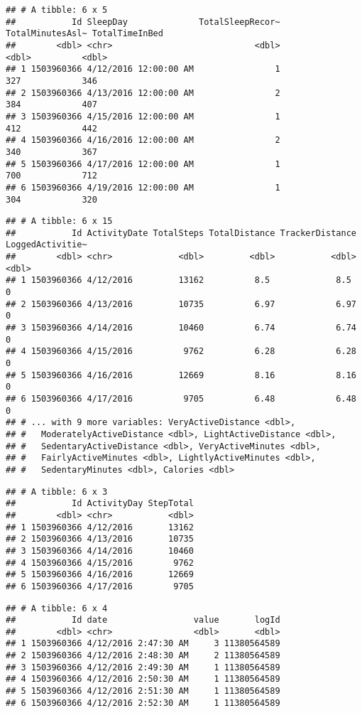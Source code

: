 \documentclass[
]{article}
\begin{document}
\begin{verbatim}
## # A tibble: 6 x 5
##           Id SleepDay              TotalSleepRecor~ TotalMinutesAsl~ TotalTimeInBed
##        <dbl> <chr>                            <dbl>            <dbl>          <dbl>
## 1 1503960366 4/12/2016 12:00:00 AM                1              327            346
## 2 1503960366 4/13/2016 12:00:00 AM                2              384            407
## 3 1503960366 4/15/2016 12:00:00 AM                1              412            442
## 4 1503960366 4/16/2016 12:00:00 AM                2              340            367
## 5 1503960366 4/17/2016 12:00:00 AM                1              700            712
## 6 1503960366 4/19/2016 12:00:00 AM                1              304            320
\end{verbatim}

\begin{verbatim}
## # A tibble: 6 x 15
##           Id ActivityDate TotalSteps TotalDistance TrackerDistance LoggedActivitie~
##        <dbl> <chr>             <dbl>         <dbl>           <dbl>            <dbl>
## 1 1503960366 4/12/2016         13162          8.5             8.5                 0
## 2 1503960366 4/13/2016         10735          6.97            6.97                0
## 3 1503960366 4/14/2016         10460          6.74            6.74                0
## 4 1503960366 4/15/2016          9762          6.28            6.28                0
## 5 1503960366 4/16/2016         12669          8.16            8.16                0
## 6 1503960366 4/17/2016          9705          6.48            6.48                0
## # ... with 9 more variables: VeryActiveDistance <dbl>,
## #   ModeratelyActiveDistance <dbl>, LightActiveDistance <dbl>,
## #   SedentaryActiveDistance <dbl>, VeryActiveMinutes <dbl>,
## #   FairlyActiveMinutes <dbl>, LightlyActiveMinutes <dbl>,
## #   SedentaryMinutes <dbl>, Calories <dbl>
\end{verbatim}

\begin{verbatim}
## # A tibble: 6 x 3
##           Id ActivityDay StepTotal
##        <dbl> <chr>           <dbl>
## 1 1503960366 4/12/2016       13162
## 2 1503960366 4/13/2016       10735
## 3 1503960366 4/14/2016       10460
## 4 1503960366 4/15/2016        9762
## 5 1503960366 4/16/2016       12669
## 6 1503960366 4/17/2016        9705
\end{verbatim}

\begin{verbatim}
## # A tibble: 6 x 4
##           Id date                 value       logId
##        <dbl> <chr>                <dbl>       <dbl>
## 1 1503960366 4/12/2016 2:47:30 AM     3 11380564589
## 2 1503960366 4/12/2016 2:48:30 AM     2 11380564589
## 3 1503960366 4/12/2016 2:49:30 AM     1 11380564589
## 4 1503960366 4/12/2016 2:50:30 AM     1 11380564589
## 5 1503960366 4/12/2016 2:51:30 AM     1 11380564589
## 6 1503960366 4/12/2016 2:52:30 AM     1 11380564589
\end{verbatim}
\end{document}
